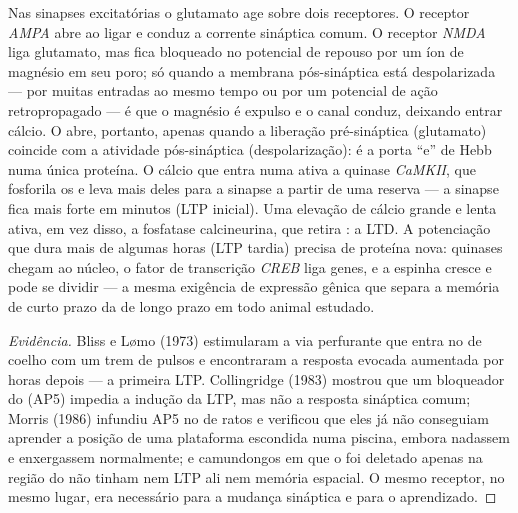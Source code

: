 \begin{proposition}\label{prop:b3:learning-memory:nmda}
Nas sinapses excitatórias o glutamato age sobre dois receptores. O
receptor \emph{AMPA} abre ao ligar e conduz a corrente sináptica comum.
O receptor \emph{NMDA} liga glutamato, mas fica bloqueado no potencial
de repouso por um íon de magnésio em seu poro; só quando a membrana
pós-sináptica está despolarizada --- por muitas entradas ao mesmo tempo
ou por um potencial de ação retropropagado --- é que o magnésio é
expulso e o canal conduz, deixando entrar cálcio. O  abre,
portanto, apenas quando a liberação pré-sináptica (glutamato) coincide
com a atividade pós-sináptica (despolarização): é a porta ``e'' de Hebb
numa única proteína. O cálcio que entra numa \emph{}
ativa a quinase \emph{CaMKII}, que fosforila os  e leva
mais deles para a sinapse a partir de uma reserva --- a sinapse fica
mais forte em minutos (LTP inicial). Uma elevação de cálcio grande e
lenta ativa, em vez disso, a fosfatase calcineurina, que retira
: a LTD. A potenciação que dura mais de algumas horas
(LTP tardia) precisa de proteína nova: quinases chegam ao núcleo, o
fator de transcrição \emph{CREB} liga genes, e a espinha cresce e pode
se dividir --- a mesma exigência de expressão gênica que separa a
memória de curto prazo da de longo prazo em todo animal estudado.
\end{proposition}

\begin{proof}[Evidência]
Bliss e L\o mo (1973) estimularam a via perfurante que entra no
 de coelho com um trem de pulsos e encontraram a resposta
evocada aumentada por horas depois --- a primeira LTP. Collingridge
(1983) mostrou que um bloqueador do  (AP5) impedia a
indução da LTP, mas não a resposta sináptica comum; Morris (1986)
infundiu AP5 no  de ratos e verificou que eles já não
conseguiam aprender a posição de uma plataforma escondida numa piscina,
embora nadassem e enxergassem normalmente; e camundongos em que o
 foi deletado apenas na região  do  não tinham
nem LTP ali nem memória espacial. O mesmo receptor, no mesmo lugar, era
necessário para a mudança sináptica e para o aprendizado.
\end{proof}

